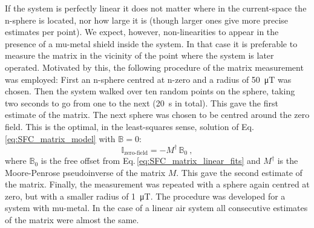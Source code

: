 If the system is perfectly linear it does not matter where in the current-space the n-sphere is located, nor how large it is (though larger ones give more precise estimates per point). We expect, however, non-linearities to appear in the presence of a mu-metal shield inside the system.
In that case it is preferable to measure the matrix in the vicinity of the point where the system is later operated. Motivated by this, the following procedure of the matrix measurement was employed: First an n-sphere centred at n-zero and a radius of \SI{50}{\micro\tesla} was chosen. Then the system walked over ten random points on the sphere, taking two seconds to go from one to the next (\SI{20}{\second} in total).
This gave the first estimate of the matrix. The next sphere was chosen to be centred around the zero field. This is the optimal, in the least-squares sense, solution of Eq.\,\ref{eq:SFC_matrix_model} with $\mathbb{B} = 0$:
\begin{equation}
  \label{eq:SFC_zero_field_requirement}
  \mathbb{I}_\text{zero-field} = - M^\dagger \, \mathbb{B}_0 \ ,
\end{equation}
where $\mathbb{B}_0$ is the free offset from Eq.\,\ref{eq:SFC_matrix_linear_fits} and $M^\dagger$ is the Moore-Penrose pseudoinverse of the matrix $M$. This gave the second estimate of the matrix. Finally, the measurement was repeated with a sphere again centred at zero, but with a smaller radius of \SI{1}{\micro\tesla}. The procedure was developed for a system with mu-metal. In the case of a linear air system all consecutive estimates of the matrix were almost the same.

